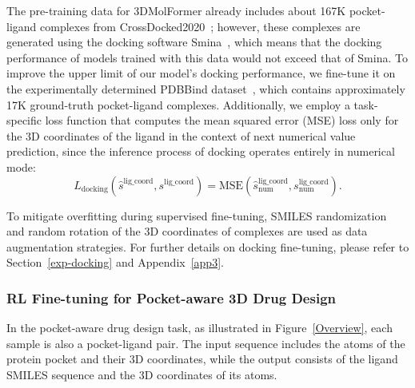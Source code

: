 The pre-training data for 3DMolFormer already includes about 167K pocket-ligand complexes from CrossDocked2020~\citep{CrossDocked}; however, these complexes are generated using the docking software Smina~\cite{Smina}, which means that the docking performance of models trained with this data would not exceed that of Smina. To improve the upper limit of our model's docking performance, we fine-tune it on the experimentally determined PDBBind dataset~\cite{PDBbind}, which contains approximately 17K ground-truth pocket-ligand complexes. Additionally, we employ a task-specific loss function that computes the mean squared error (MSE) loss only for the 3D coordinates of the ligand in the context of next numerical value prediction, since the inference process of docking operates entirely in numerical mode:
\begin{equation}
L_{\mathrm{docking}}(\hat{s}^\mathrm{lig\_coord},s^\mathrm{lig\_coord})=\mathrm{MSE}(\hat{s}_\mathrm{num}^\mathrm{lig\_coord}, s_\mathrm{num}^\mathrm{lig\_coord}).
\end{equation}

To mitigate overfitting during supervised fine-tuning, SMILES randomization~\citep{SMILESRandomization} and random rotation of the 3D coordinates of complexes are used as data augmentation strategies. For further details on docking fine-tuning, please refer to Section~\ref{exp-docking} and Appendix~\ref{app3}.

\subsubsection{RL Fine-tuning for Pocket-aware 3D Drug Design}
In the pocket-aware drug design task, as illustrated in Figure~\ref{Overview}, each sample is also a pocket-ligand pair. The input sequence includes the atoms of the protein pocket and their 3D coordinates, while the output consists of the ligand SMILES sequence and the 3D coordinates of its atoms.

